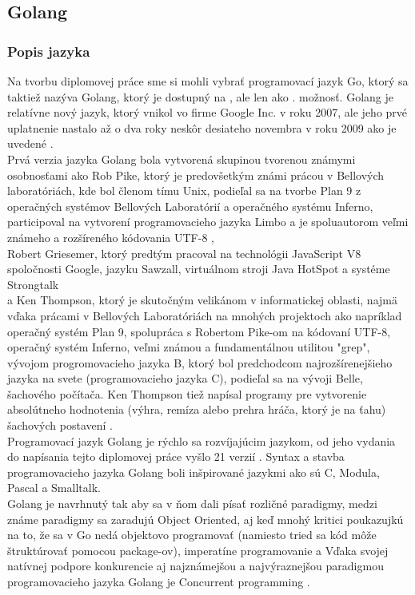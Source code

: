 \newpage
\subsection{Golang}
\subsubsection{Popis jazyka}
\tab[5 mm] Na tvorbu diplomovej práce sme si mohli vybrať programovací jazyk Go, ktorý sa taktiež nazýva Golang, ktorý je dostupný na \cite{GOlang7}, ale len ako . možnosť.
Golang je relatívne nový jazyk, ktorý vnikol vo firme Google Inc. v roku 2007, ale jeho prvé uplatnenie nastalo 
až o dva roky neskôr desiateho novembra v roku 2009 ako je uvedené \cite{GOlang8}.\\
\tab[5 mm] Prvá verzia jazyka Golang bola vytvorená skupinou tvorenou známymi osobnosťami ako Rob Pike, ktorý je 
predovšetkým známi prácou v Bellových laboratóriách, kde bol členom tímu Unix, 
podieľal sa na tvorbe Plan 9 z operačných systémov Bellových Laboratórií a operačného systému Inferno, 
participoval na vytvorení programovacieho jazyka Limbo a je spoluautorom veľmi známeho a rozšíreného kódovania UTF-8 \cite{GOlang9},\\
Robert Griesemer, ktorý predtým pracoval na technológii JavaScript V8 spoločnosti Google, jazyku Sawzall, virtuálnom stroji Java HotSpot a systéme Strongtalk \cite{GOlang10} \\
a Ken Thompson, ktorý je skutočným velikánom v informatickej oblasti, najmä vďaka prácami
v Bellových Laboratóriách na mnohých projektoch ako napríklad operačný systém Plan 9, 
spolupráca s Robertom Pike-om na kódovaní UTF-8, operačný systém Inferno, veľmi známou a 
fundamentálnou utilitou "grep", vývojom progromovacieho jazyka B, ktorý bol predchodcom 
najrozšírenejšieho jazyka na svete (programovacieho jazyka C), podieľal sa na vývoji Belle, šachového počítača. 
Ken Thompson tiež napísal programy pre vytvorenie absolútneho hodnotenia 
(výhra, remíza alebo prehra hráča, ktorý je na ťahu) šachových postavení \cite{GOlang11}.\\
\tab[5 mm] Programovací jazyk Golang je rýchlo sa rozvíjajúcim jazykom, od jeho vydania do napísania 
tejto diplomovej práce vyšlo 21 verzií . Syntax a stavba programovacieho jazyka Golang boli inšpirované jazykmi ako sú C, Modula, Pascal a Smalltalk. \\ 
\tab[5 mm] Golang je navrhnutý tak aby sa v ňom dali písať rozličné paradigmy, medzi známe paradigmy sa zaradujú Object Oriented, aj keď mnohý kritici poukazujkú na to, že sa v Go nedá objektovo programovať (namiesto tried sa kód môže štruktúrovať pomocou package-ov), imperatíne programovanie a Vďaka svojej natívnej podpore konkurencie aj najznámejšou a najvýraznejšou paradigmou programovacieho jazyka Golang je Concurrent programming \cite{GOlang12}. \\
